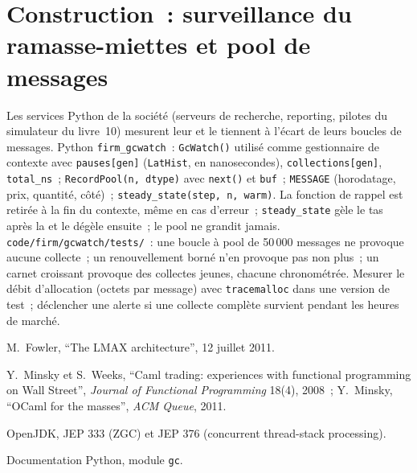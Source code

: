 \section{Construction~: surveillance du ramasse-miettes et pool de messages}\label{bld:ll:managed-and-functional-languages-on-the-desk:gcwatch}

\begin{build}
 Les services Python de la société (serveurs de recherche, reporting, pilotes du simulateur du livre~10)
mesurent leur  et le tiennent à l'écart de leurs boucles de messages.
 Python \texttt{firm\_gcwatch}~: \texttt{GcWatch()} utilisé comme gestionnaire de contexte avec \texttt{pauses[gen]}
(\texttt{LatHist}, en nanosecondes), \texttt{collections[gen]}, \texttt{total\_ns}~; \texttt{RecordPool(n, dtype)} avec
\texttt{next()} et \texttt{buf}~; \texttt{MESSAGE} (horodatage, prix, quantité, côté)~;
\texttt{steady\_state(step, n, warm)}.
 La fonction de rappel est retirée à la fin du contexte, même en cas d'erreur~; \texttt{steady\_state} gèle le tas après
la  et le dégèle ensuite~; le pool ne grandit jamais.
 \texttt{code/firm/gcwatch/tests/}~: une boucle à pool de 50\,000 messages ne provoque aucune collecte~; un
renouvellement borné n'en provoque pas non plus~; un carnet croissant provoque des collectes jeunes, chacune chronométrée.
 Mesurer le débit d'allocation (octets par message) avec \texttt{tracemalloc} dans une version de test~; déclencher une alerte si une
collecte complète survient pendant les heures de marché.
\end{build}

\begin{omsources}
\item M.~Fowler, ``The LMAX architecture'', 12 juillet 2011.
\item Y.~Minsky et S.~Weeks, ``Caml trading: experiences with functional programming on Wall Street'', \emph{Journal of
Functional Programming} 18(4), 2008~; Y.~Minsky, ``OCaml for the masses'', \emph{ACM Queue}, 2011.
\item OpenJDK, JEP 333 (ZGC) et JEP 376 (concurrent thread-stack processing).
\item Documentation Python, module \texttt{gc}.
\end{omsources}

